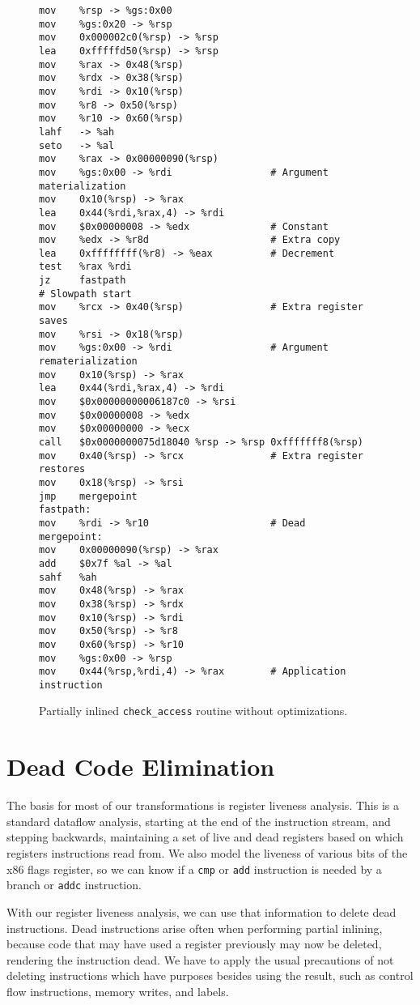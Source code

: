 \begin{figure}
\begin{verbatim}
mov    %rsp -> %gs:0x00
mov    %gs:0x20 -> %rsp
mov    0x000002c0(%rsp) -> %rsp
lea    0xfffffd50(%rsp) -> %rsp
mov    %rax -> 0x48(%rsp)
mov    %rdx -> 0x38(%rsp)
mov    %rdi -> 0x10(%rsp)
mov    %r8 -> 0x50(%rsp)
mov    %r10 -> 0x60(%rsp)
lahf   -> %ah
seto   -> %al
mov    %rax -> 0x00000090(%rsp)
mov    %gs:0x00 -> %rdi                 # Argument materialization
mov    0x10(%rsp) -> %rax
lea    0x44(%rdi,%rax,4) -> %rdi
mov    $0x00000008 -> %edx              # Constant
mov    %edx -> %r8d                     # Extra copy
lea    0xffffffff(%r8) -> %eax          # Decrement
test   %rax %rdi
jz     fastpath
# Slowpath start
mov    %rcx -> 0x40(%rsp)               # Extra register saves
mov    %rsi -> 0x18(%rsp)
mov    %gs:0x00 -> %rdi                 # Argument rematerialization
mov    0x10(%rsp) -> %rax
lea    0x44(%rdi,%rax,4) -> %rdi
mov    $0x00000000006187c0 -> %rsi
mov    $0x00000008 -> %edx
mov    $0x00000000 -> %ecx
call   $0x0000000075d18040 %rsp -> %rsp 0xfffffff8(%rsp)
mov    0x40(%rsp) -> %rcx               # Extra register restores
mov    0x18(%rsp) -> %rsi
jmp    mergepoint
fastpath:
mov    %rdi -> %r10                     # Dead
mergepoint:
mov    0x00000090(%rsp) -> %rax
add    $0x7f %al -> %al
sahf   %ah
mov    0x48(%rsp) -> %rax
mov    0x38(%rsp) -> %rdx
mov    0x10(%rsp) -> %rdi
mov    0x50(%rsp) -> %r8
mov    0x60(%rsp) -> %r10
mov    %gs:0x00 -> %rsp
mov    0x44(%rsp,%rdi,4) -> %rax        # Application instruction
\end{verbatim}
\caption{Partially inlined {\tt check\_access} routine without optimizations.}
\label{fig:alignment_partial_noopt}
\end{figure}

\section{Dead Code Elimination}

The basis for most of our transformations is register liveness analysis.  This
is a standard dataflow analysis, starting at the end of the instruction stream,
and stepping backwards, maintaining a set of live and dead registers based on
which registers instructions read from.  We also model the liveness of various
bits of the x86 flags register, so we can know if a {\tt cmp} or {\tt add}
instruction is needed by a branch or {\tt addc} instruction.

With our register liveness analysis, we can use that information to delete dead
instructions.  Dead instructions arise often when performing partial inlining,
because code that may have used a register previously may now be deleted,
rendering the instruction dead.  We have to apply the usual precautions of not
deleting instructions which have purposes besides using the result, such as
control flow instructions, memory writes, and labels.

